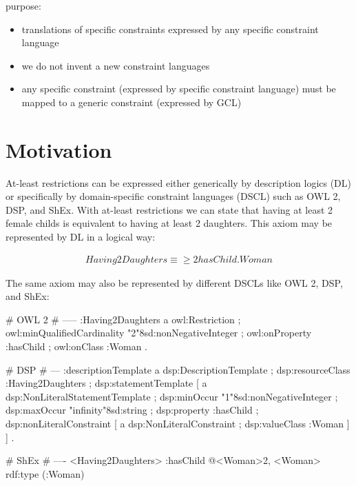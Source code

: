 \documentclass{llncs}
\begin{document}
purpose:
\begin{itemize}
	\item translations of specific constraints expressed by any specific constraint language
	\item we do not invent a new constraint languages
\end{itemize}



\begin{itemize}
	\item any specific constraint (expressed by specific constraint language) must be mapped to a generic constraint (expressed by GCL)
\end{itemize}

\section{Motivation}

At-least restrictions can be expressed either generically by description logics (DL) or specifically by domain-specific constraint languages (DSCL) such as OWL 2, DSP, and ShEx.
With at-least restrictions we can state that having at least 2 female childs is equivalent to having at least 2 daughters. This axiom may be represented by DL in a logical way:

\begin{align*}
Having2Daughters \equiv \geq 2 hasChild.Woman
\end{align*}

The same axiom may also be represented by different DSCLs like OWL 2, DSP, and ShEx:

\begin{ex}
# OWL 2
# -----
:Having2Daughters
    a owl:Restriction ;
    owl:minQualifiedCardinality "2"^^xsd:nonNegativeInteger ;
    owl:onProperty :hasChild ;
    owl:onClass :Woman .
		
# DSP
# ---			
:descriptionTemplate 
    a dsp:DescriptionTemplate ; 
    dsp:resourceClass :Having2Daughters ; 
    dsp:statementTemplate [
        a dsp:NonLiteralStatementTemplate ;
        dsp:minOccur "1"^^xsd:nonNegativeInteger ; 
        dsp:maxOccur "infinity"^^xsd:string ; 
        dsp:property :hasChild ; 
        dsp:nonLiteralConstraint [ 
            a dsp:NonLiteralConstraint ;
            dsp:valueClass :Woman ] ] .

# ShEx
# ----
<Having2Daughters> {         
    :hasChild @<Woman>{2, }
}
<Woman> {         
    rdf:type (:Woman)
}
\end{ex}
\end{document}
